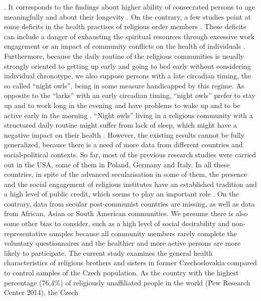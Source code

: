\documentclass[ijerph,article,accept,moreauthors,pdftex]{mdpi}
\begin{document}
\citep{keohane2019nun, schott2019stability}. It corresponds to the
findings about higher ability of consecrated persons to age meaningfully
\citep{corwin2020care} and about their longevity
\citep{weinstein2019autonomous, danner2001positive}. On the contrary, a
few studies point at some deficits in the health practises of religious
order members \citep{meurer1990exploratory}. These deficits can include
a danger of exhausting the spiritual resources through excessive work
engagement \citep{bickerton2013spiritual} or an impact of community
conflicts on the health of individuals \citep{bowen2018community}.
Furthermore, because the daily routine of the religious communities is
usually strongly oriented to getting up early and going to bed early
without considering individual chronotype, we also suppose persons with
a late circadian timing, the so called ``night owls'', being in some
measure handicapped by this regime. As opposite to the ``larks'' with an
early circadian timing, ``night owls'' prefer to stay up and to work
long in the evening and have problems to wake up and to be active early
in the morning \citep{facer2019resetting}. ``Night owls'' living in a
religious community with a structured daily routine might suffer from
lack of sleep, which might have a negative impact on their health
\citep{duns2019sleep}. However, the existing results cannot be fully
generalized, because there is a need of more data from different
countries and social-political contexts. So far, most of the previous
research studies were carried out in the USA, some of them in Poland,
Germany and Italy. In all these countries, in spite of the advanced
secularisation in some of them, the presence and the social engagement
of religious institutes have an established tradition and a high level
of public credit, which seems to play an important role
\citep{rogowska2020investigating}. On the contrary, data from secular
post-communist countries are missing, as well as data from African,
Asian or South American communities. We presume there is also some other
bias to consider, such as a high level of social desirability and
non-representative samples because all community members rarely complete
the voluntary questionnaires and the healthier and more active persons
are more likely to participate. The current study examines the general
health characteristics of religious brothers and sisters in former
Czechoslovakia compared to control samples of the Czech population. As
the country with the highest percentage (76,4\%) of religiously
unaffiliated people in the world (Pew Research Center 2014), the Czech
\end{document}
